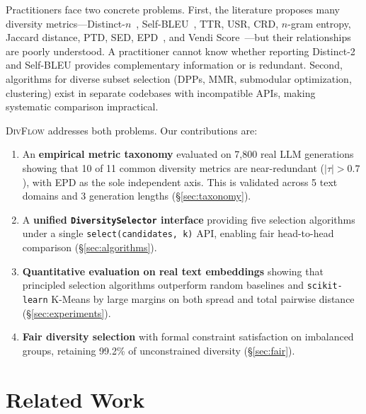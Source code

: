\documentclass[11pt]{article}
\begin{document}
Practitioners face two concrete problems.
First, the literature proposes many diversity
metrics---Distinct-$n$~\citep{li2016diversity},
Self-BLEU~\citep{zhu2018texygen}, TTR, USR, CRD, $n$-gram entropy,
Jaccard distance, PTD, SED,
EPD~\citep{friedman2023vendi},
and Vendi Score~\citep{friedman2023vendi}---but their relationships
are poorly understood.
A practitioner cannot know whether reporting
Distinct-2 and Self-BLEU provides complementary information or is redundant.
Second, algorithms for diverse subset selection (DPPs, MMR, submodular
optimization, clustering) exist in separate codebases with incompatible
APIs, making systematic comparison impractical.

\textsc{DivFlow} addresses both problems.
Our contributions are:

\begin{enumerate}[leftmargin=*]
\item An \textbf{empirical metric taxonomy} evaluated on 7{,}800 real
  LLM generations showing that 10 of 11 common diversity metrics are
  near-redundant ($|\tau| > 0.7$), with EPD as the sole independent axis.
  This is validated across 5 text domains and 3 generation lengths
  (\S\ref{sec:taxonomy}).

\item A \textbf{unified \texttt{DiversitySelector} interface}
  providing five selection algorithms under a single
  \texttt{select(candidates, k)} API, enabling fair head-to-head
  comparison (\S\ref{sec:algorithms}).

\item \textbf{Quantitative evaluation on real text embeddings}
  showing that principled selection algorithms outperform random
  baselines and \texttt{scikit-learn} K-Means by large margins
  on both spread and total pairwise distance (\S\ref{sec:experiments}).

\item \textbf{Fair diversity selection} with formal constraint
  satisfaction on imbalanced groups, retaining 99.2\% of
  unconstrained diversity (\S\ref{sec:fair}).
\end{enumerate}

\section{Related Work}
\label{sec:related}
\end{document}
